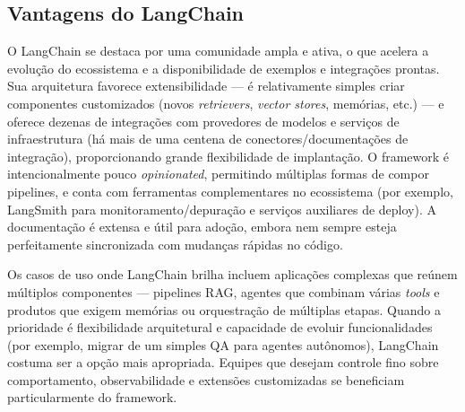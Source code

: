 \documentclass[12pt]{article}
\begin{document}
\subsection{Vantagens do LangChain}
\label{subsec:vantagens}

O LangChain se destaca por uma comunidade ampla e ativa, o que acelera a evolução do ecossistema e a disponibilidade de exemplos e integrações prontas. Sua arquitetura favorece extensibilidade — é relativamente simples criar componentes customizados (novos \textit{retrievers}, \textit{vector stores}, memórias, etc.) — e oferece dezenas de integrações com provedores de modelos e serviços de infraestrutura (há mais de uma centena de conectores/documentações de integração), proporcionando grande flexibilidade de implantação. O framework é intencionalmente pouco \emph{opinionated}, permitindo múltiplas formas de compor pipelines, e conta com ferramentas complementares no ecossistema (por exemplo, LangSmith para monitoramento/depuração e serviços auxiliares de deploy). A documentação é extensa e útil para adoção, embora nem sempre esteja perfeitamente sincronizada com mudanças rápidas no código. \cite{langchain2023docs, langchain2023github, langsmith2023}


Os casos de uso onde LangChain brilha incluem aplicações complexas que reúnem múltiplos componentes — pipelines RAG, agentes que combinam várias \textit{tools} e produtos que exigem memórias ou orquestração de múltiplas etapas. Quando a prioridade é flexibilidade arquitetural e capacidade de evoluir funcionalidades (por exemplo, migrar de um simples QA para agentes autônomos), LangChain costuma ser a opção mais apropriada. Equipes que desejam controle fino sobre comportamento, observabilidade e extensões customizadas se beneficiam particularmente do framework. \cite{langchain2023docs, langchain2023github}
\end{document}
